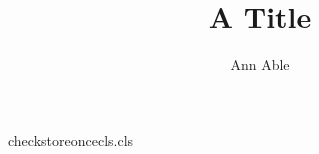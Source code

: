 \begin{filecontents*}[force]{checkstoreoncecls.cls}
\newcount\aucount
\def\author#1{\advance\aucount by 1 \gdef\@author{#1}}
\def\extrainfo#1{\gdef\@extrainfo{#1}}\def\@extrainfo{}
\def\corr#1{\gdef\@corr{#1}}\def\@corr{}
\def\gated#1{\gdef\@gated{#1}}\def\@gated{}
\renewcommand\maketitle{\par\begingroup\centering{\Large\@title\par}%
  {\@author\thanks{Corresponding author: \@corr}\par}\ifnum\aucount>1 \@gated\fi\@thanks\endgroup{\@extrainfo\par}}
\end{filecontents*}
\documentclass{checkstoreoncecls}
\title{A Title}
\author{Ann Able}
\maketitle
Text.

